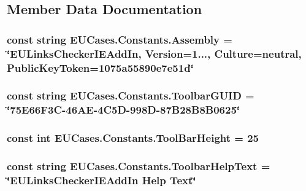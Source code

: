 \subsection{Member Data Documentation}
\hypertarget{class_e_u_cases_1_1_constants_acda121e2c24e81e72efee79f53e601cf}{
\subsubsection[{Assembly}]{\setlength{\rightskip}{0pt plus 5cm}const string E\+U\+Cases.\+Constants.\+Assembly = \char`\"{}E\+U\+Links\+Checker\+I\+E\+Add\+In, Version=1..., Culture=neutral, Public\+Key\+Token=1075a55890e7e51d\char`\"{}}}\label{class_e_u_cases_1_1_constants_acda121e2c24e81e72efee79f53e601cf}
\hypertarget{class_e_u_cases_1_1_constants_a982187f9c0faae3b5cc660b59b8fd03e}{
\subsubsection[{Toolbar\+G\+U\+I\+D}]{\setlength{\rightskip}{0pt plus 5cm}const string E\+U\+Cases.\+Constants.\+Toolbar\+G\+U\+I\+D = \char`\"{}75\+E66\+F3\+C-\/46\+A\+E-\/4\+C5\+D-\/998\+D-\/87\+B28\+B8\+B0625\char`\"{}}}\label{class_e_u_cases_1_1_constants_a982187f9c0faae3b5cc660b59b8fd03e}
\hypertarget{class_e_u_cases_1_1_constants_a712b032ba1697ccec5340ed1227f3643}{
\subsubsection[{Tool\+Bar\+Height}]{\setlength{\rightskip}{0pt plus 5cm}const int E\+U\+Cases.\+Constants.\+Tool\+Bar\+Height = 25}}\label{class_e_u_cases_1_1_constants_a712b032ba1697ccec5340ed1227f3643}
\hypertarget{class_e_u_cases_1_1_constants_a607db4405898fbbbea14415c5bd3814d}{
\subsubsection[{Toolbar\+Help\+Text}]{\setlength{\rightskip}{0pt plus 5cm}const string E\+U\+Cases.\+Constants.\+Toolbar\+Help\+Text = \char`\"{}E\+U\+Links\+Checker\+I\+E\+Add\+In Help Text\char`\"{}}}\label{class_e_u_cases_1_1_constants_a607db4405898fbbbea14415c5bd3814d}
